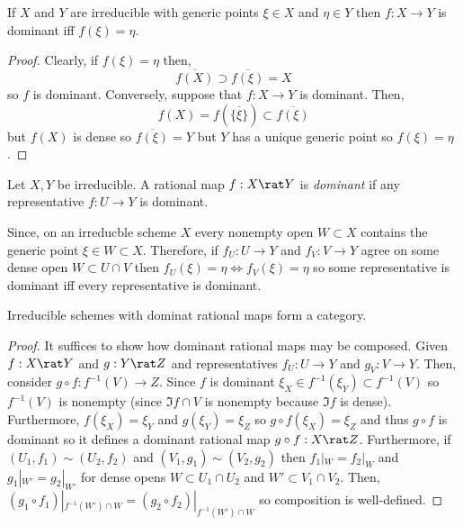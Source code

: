 \documentclass[12pt]{article}
\begin{document}
\begin{lemma}
If $X$ and $Y$ are irreducible with generic points $\xi \in X$ and $\eta \in Y$ then $f : X \to Y$ is dominant iff $f(\xi) = \eta$. 
\end{lemma}

\begin{proof}
Clearly, if $f(\xi) = \eta$ then,
\[ \overline{f(X)} \supset \overline{f(\xi)} = X \]
so $f$ is dominant. Conversely, suppose that $f : X \to Y$ is dominant. Then,
\[ f(X) = f(\overline{\{ \xi \}}) \subset \overline{f(\xi)} \]
but $f(X)$ is dense so $\overline{f(\xi)} = Y$ but $Y$ has a unique generic point so $f(\xi) = \eta$.
\end{proof}

\begin{definition}
Let $X, Y$ be irreducible. A rational map $f : X \rat Y$ is \textit{dominant} if any representative $f : U \to Y$ is dominant.
\end{definition}

\begin{rmk}
Since, on an irreducble scheme $X$ every nonempty open $W \subset X$ contains the generic point $\xi \in W \subset X$. Therefore, if $f_U : U \to Y$ and $f_V : V \to Y$ agree on some dense open $W \subset U \cap V$ then $f_U(\xi) = \eta \iff f_V(\xi) = \eta$ so some representative is dominant iff every representative is dominant. 
\end{rmk}

\begin{prop}
Irreducible schemes with dominat rational maps form a category. 
\end{prop}

\begin{proof}
It suffices to show how dominant rational maps may be composed. Given $f : X \rat Y$ and $g : Y \rat Z$ and representatives $f_U : U \to Y$ and $g_V : V \to Y$. Then, consider $g \circ f : f^{-1}(V) \to Z$. Since $f$ is dominant $\xi_X \in f^{-1}(\xi_Y) \subset f^{-1}(V)$ so $f^{-1}(V)$ is nonempty (since $\Im{f} \cap V$ is nonempty because $\Im{f}$ is dense). Furthermore, $f(\xi_X) = \xi_Y$ and $g(\xi_Y) = \xi_Z$ so $g \circ f(\xi_X) = \xi_Z$ and thus $g \circ f$ is dominant so it defines a dominant rational map $g \circ f : X \rat Z$. Furthermore, if $(U_1, f_1) \sim (U_2, f_2)$ and $(V_1, g_1) \sim (V_2, g_2)$ then $f_1 |_W = f_2 |_W$ and $g_1 |_{W'} = g_2 |_{W'}$ for dense opens $W \subset U_1 \cap U_2$ and $W' \subset V_1 \cap V_2$. Then, $(g_1 \circ f_1) |_{f^{-1}(W') \cap W} = (g_2 \circ f_2) |_{f^{-1}(W') \cap W}$ so composition is well-defined. 
\end{proof}
\end{document}
